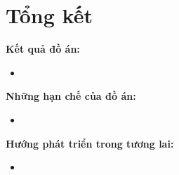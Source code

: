 \chapter{Tổng kết}
\noindent\textbf{Kết quả đồ án:}
  \begin{itemize}
    \item 
  \end{itemize}

\noindent\textbf{Những hạn chế của đồ án:}
  \begin{itemize}
    \item 
  \end{itemize}

\noindent\textbf{Hướng phát triển trong tương lai:}
  \begin{itemize}
    \item 
  \end{itemize}